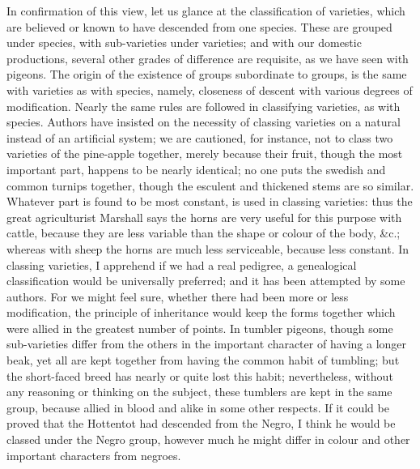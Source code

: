 \indent In confirmation of this view, let us glance at the classification of varieties, which are believed or known to have descended from one species. These are grouped under species, with sub-varieties under varieties; and with our domestic productions, several other grades of difference are requisite, as we have seen with pigeons. The origin of the existence of groups subordinate to groups, is the same with varieties as with species, namely, closeness of descent with various degrees of modification. Nearly the same rules are followed in classifying varieties, as with species. Authors have insisted on the necessity of classing varieties on a natural instead of an artificial system; we are cautioned, for instance, not to class two varieties of the pine-apple together, merely because their fruit, though the most important part, happens to be nearly identical; no one puts the swedish and common turnips together, though the esculent and thickened stems are so similar. Whatever part is found to be most constant, is used in classing varieties: thus the great agriculturist Marshall says the horns are very useful for this purpose with cattle, because they are less variable than the shape or colour of the body, \&c.; whereas with sheep the horns are much less serviceable, because less constant. In classing varieties, I apprehend if we had a real pedigree, a genealogical classification would be universally preferred; and it has been attempted by some authors. For we might feel sure, whether there had been more or less modification, the principle of inheritance would keep the forms together which were allied in the greatest number of points. In tumbler pigeons, though some sub-varieties differ from the others in the important character of having a longer beak, yet all are kept together from having the common habit of tumbling; but the short-faced breed has nearly or quite lost this habit; nevertheless, without any reasoning or thinking on the subject, these tumblers are kept in the same group, because allied in blood and alike in some other respects. If it could be proved that the Hottentot had descended from the Negro, I think he would be classed under the Negro group, however much he might differ in colour and other important characters from negroes.~\\
